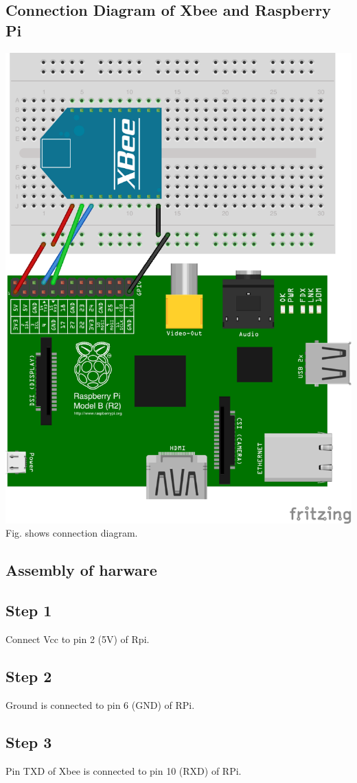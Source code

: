 \documentclass[a4paper,12pt,oneside]{book}
\begin{document}
\subsection*{Connection Diagram of Xbee and Raspberry Pi}
\centering
\includegraphics[scale=0.2]{raspi_to_xbee}
\flushleft
Fig. shows connection diagram.
\subsection*{Assembly of harware}
\subsection*{Step 1}
Connect Vcc to pin 2 (5V) of Rpi.
\subsection*{Step 2}
Ground is connected to pin 6 (GND) of RPi.
\subsection*{Step 3}
Pin TXD of Xbee is connected to pin 10 (RXD) of RPi.
\end{document}
